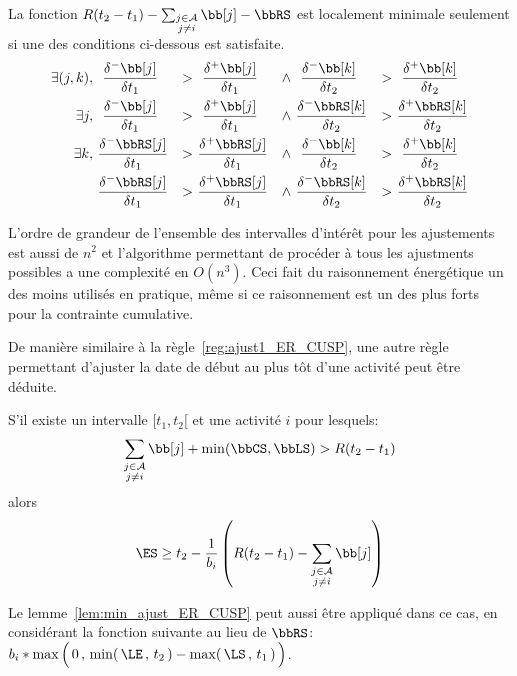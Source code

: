 \begin{lemma}
\label{lem:min_ajust_ER_CUSP}
La fonction $R(t_2-t_1) -\sum_{\substack{j \in \A \\ j \neq i}} \bb[j]
- \bbRS $ est localement minimale seulement si une des conditions
ci-dessous est satisfaite.
\begin{align} 
\exists (j,k), \ &~\frac{\delta^{-}\bb[j]}{\delta t_1}
&>~&~\frac{\delta^{+}\bb[j]}{\delta t_1}
&\land~&~\frac{\delta^{-}\bb[k]}{\delta t_2} & >~&
~\frac{\delta^{+}\bb[k]}{\delta t_2} \label{eq:deriv1_adj_CUSP}\\
\exists j , \ &~\frac{\delta^{-}\bb[j]}{\delta t_1}
&>~&~\frac{\delta^{+}\bb[j]}{\delta t_1}
&\land~&\frac{\delta^{-}\bbRS[k]}{\delta t_2} & >~&
\frac{\delta^{+}\bbRS[k]}{\delta t_2} \label{eq:deriv2_adj_CUSP}\\
\exists k, \ &\frac{\delta^{-}\bbRS[j]}{\delta t_1}
&>~&\frac{\delta^{+}\bbRS[j]}{\delta t_1}
&\land~&~\frac{\delta^{-}\bb[k]}{\delta t_2} & >~&
~\frac{\delta^{+}\bb[k]}{\delta t_2} \label{eq:deriv3_adj_CUSP}\\
 &\frac{\delta^{-}\bbRS[j]}{\delta t_1}
&>~&\frac{\delta^{+}\bbRS[j]}{\delta t_1}
&\land~&\frac{\delta^{-}\bbRS[k]}{\delta t_2} & >~&
\frac{\delta^{+}\bbRS[k]}{\delta t_2} \label{eq:deriv4_adj_CUSP}
\end{align}
\end{lemma}

L'ordre de grandeur de l'ensemble des intervalles d'intérêt pour les
ajustements est aussi de $n^2$ et l'algorithme permettant de procéder
à tous les ajustments possibles a une complexité en $O(n^3)$. Ceci
fait du raisonnement énergétique un des moins utilisés en pratique,
même si ce raisonnement est un des plus forts pour la contrainte
cumulative. 


De manière similaire à la règle~\ref{reg:ajust1_ER_CUSP}, une autre
règle permettant d'ajuster la date de début au plus tôt d'une activité
peut être déduite.

\begin{reg}
  \label{reg:ajust2_ER_CUSP}
  S'il existe un intervalle $[t_1,t_2[$ et une activité $i$ pour lesquels:
  \[ \sum_{\substack{j \in \A \\ j \neq i}} \bb[j] +
    \min(\bbCS,\bbLS) > R (t_2-t_1)\] 
  alors 
  \[  \ES \ge t_2 - \frac{1}{b_i} \left(R (t_2-t_1)  -\sum_{\substack{j \in \A \\ j
          \neq i}} \bb[j]  \right) \]
\end{reg}

Le lemme~\ref{lem:min_ajust_ER_CUSP} peut aussi être appliqué dans ce
cas, en considérant la fonction suivante au lieu de $\bbRS$:
$b_i*\max\Big(\, 0\, , \, \min(\, \LE\, ,\, t_2\,) - \max(\, \LS\, ,
  \, t_1\,) \,\Big)$. 


